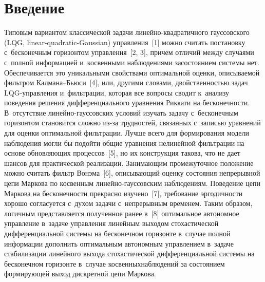 
  
\vspace*{-2pt}



\thispagestyle{headings}

\begin{multicols}{2}

\label{st\stat}

\section{Введение}

     Типовым вариантом классической задачи ли\-ней\-но-квад\-ра\-тич\-но\-го 
гауссовского (LQG, linear-quadratic-Gaussian) управ\-ле\-ния~[1] можно считать постановку 
с~бесконечным горизонтом управления~[2, 3], причем отличий между 
случаями с~полной информацией и~косвенными наблюдениями за\linebreak состоянием 
системы нет. Обеспечивается это уникальными свойствами оптимальной 
оценки, описываемой фильтром Кал\-ма\-на--Бью\-си~[4], или, \mbox{другими} 
словами, двойственностью задач LQG-управ\-ле\-ния и~фильтрации, которая 
все вопросы сводит к~анализу поведения решения дифференциального 
уравнения Риккати на бесконечности. В~отсутствие  
ли\-ней\-но-гаус\-сов\-ских условий изучать задачу с~бесконечным 
горизонтом становится сложно из-за трудностей, связанных с~записью 
уравнений для оценки оптимальной фильтрации. Лучше всего для 
формирования модели наблюдения могли бы подойти общие уравнения 
нелинейной фильтрации на основе обновляющих процессов~[5], но их 
конструкция такова, что не дает шансов для практической реализации. 
Занимающим промежуточное положение можно считать фильтр Вонэма~[6], 
описывающий оценку состояния непрерывной цепи Маркова по косвенным 
линейно-гауссовским наблюдениям. Поведение цепи Маркова на 
бесконечности прекрасно изучено~[7], требование эргодичности хорошо 
согласуется с~духом задачи с~непрерывным временем. Таким образом, 
логичным представляется полученное ранее в~[8] оптимальное автономное 
управ\-ле\-ние в~задаче управ\-ле\-ния линейным выходом стохастической 
дифференциальной системы на бесконечном горизонте в~случае полной 
информации дополнить оптимальным автономным управ\-ле\-ни\-ем в~задаче 
стабилизации линейного выхода стохастической дифференциальной сис\-те\-мы 
на бесконечном горизонте в~случае косвенных\linebreak наблюдений за состоянием 
фор\-ми\-ру\-ющей выход дискретной цепи Маркова.


\end{multicols}
